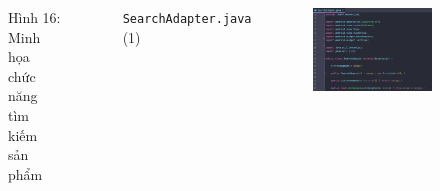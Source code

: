 \documentclass{beamer}
\begin{document}
\begin{frame}
\begin{columns}
\begin{figure}
            \caption{\centering\tiny{Hình 16: Minh họa chức năng tìm kiếm sản phẩm}}
        \end{figure}
        \indent \texttt{SearchAdapter.java} (1)
        \begin{figure}
            \centering
            \includegraphics[width=\textwidth]{images/48.png}
        \end{figure}
    \end{columns}
\end{frame}
\end{document}
